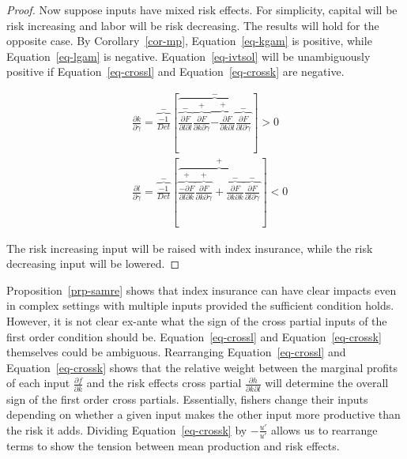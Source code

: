 \documentclass[
  super,
  preprint,
  3p]{elsarticle}
\theoremstyle{plain}
\theoremstyle{plain}
\theoremstyle{remark}
\begin{document}
\begin{proof}
Now suppose inputs have mixed risk effects. For simplicity, capital will
be risk increasing and labor will be risk decreasing. The results will
hold for the opposite case. By Corollary~\ref{cor-mp},
Equation~\ref{eq-kgam} is positive, while Equation~\ref{eq-lgam} is
negative. Equation~\ref{eq-ivtsol} will be unambiguously positive if
Equation~\ref{eq-crossl} and Equation~\ref{eq-crossk} are negative.

\[
\begin{aligned}
&\frac{\partial k}{\partial \gamma}=\overbrace{\frac{-1}{Det}}^{-}\left[\overbrace{\overbrace{\frac{\partial F}{\partial l \partial l}}^{-}\overbrace{\frac{\partial F}{\partial k \partial \gamma}}^{+}\overbrace{-\frac{\partial F}{\partial k \partial l}}^{+}\overbrace{\frac{\partial F}{\partial l \partial \gamma}}^{-}}^{-}\right] >0\\
&\frac{\partial l}{\partial \gamma}=\overbrace{\frac{-1}{Det}}^{-}\left[\overbrace{\overbrace{\frac{-\partial F}{\partial l \partial k}}^{+}\overbrace{\frac{\partial F}{\partial k \partial \gamma}}^{+}+\overbrace{\frac{\partial F}{\partial k \partial k}}^{-}\overbrace{\frac{\partial F}{\partial l \partial \gamma}}^{-}}^{+}\right]<0
\end{aligned}
\]

The risk increasing input will be raised with index insurance, while the
risk decreasing input will be lowered.

\end{proof}

Proposition~\ref{prp-samre} shows that index insurance can have clear
impacts even in complex settings with multiple inputs provided the
sufficient condition holds. However, it is not clear ex-ante what the
sign of the cross partial inputs of the first order condition should be.
Equation~\ref{eq-crossl} and Equation~\ref{eq-crossk} themselves could
be ambiguous. Rearranging Equation~\ref{eq-crossl} and
Equation~\ref{eq-crossk} shows that the relative weight between the
marginal profits of each input \(\frac{\partial f}{\partial k}\) and the
risk effects cross partial \(\frac{\partial h}{\partial k \partial l}\)
will determine the overall sign of the first order cross partials.
Essentially, fishers change their inputs depending on whether a given
input makes the other input more productive than the risk it adds.
Dividing Equation~\ref{eq-crossk} by \(-\frac{u'}{u'}\) allows us to
rearrange terms to show the tension between mean production and risk
effects.
\end{document}
